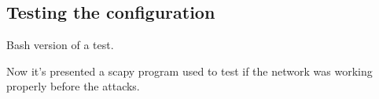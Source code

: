 \subsection{Testing the configuration}
Bash version of a test.\par

Now it's presented a scapy program used to test if the network was working properly before the attacks.\par

